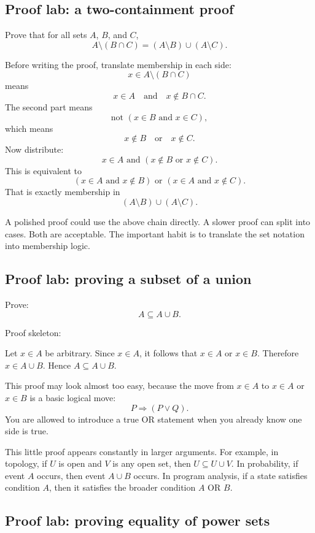 \subsection{Proof lab: a two-containment proof}

\begin{labbox}
Prove that for all sets $A$, $B$, and $C$,
\[
A\setminus(B\cap C)=(A\setminus B)\cup(A\setminus C).
\]

Before writing the proof, translate membership in each side:
\[
x\in A\setminus(B\cap C)
\]
means
\[
x\in A\quad\text{and}\quad x\notin B\cap C.
\]
The second part means
\[
\text{not }(x\in B\text{ and }x\in C),
\]
which means
\[
x\notin B\quad\text{or}\quad x\notin C.
\]
Now distribute:
\[
x\in A\text{ and }(x\notin B\text{ or }x\notin C).
\]
This is equivalent to
\[
(x\in A\text{ and }x\notin B)\text{ or }(x\in A\text{ and }x\notin C).
\]
That is exactly membership in
\[
(A\setminus B)\cup(A\setminus C).
\]
\end{labbox}

A polished proof could use the above chain directly. A slower proof can split into cases. Both are acceptable. The important habit is to translate the set notation into membership logic.

\subsection{Proof lab: proving a subset of a union}

\begin{labbox}
Prove:
\[
A\subseteq A\cup B.
\]

Proof skeleton:

Let $x\in A$ be arbitrary. Since $x\in A$, it follows that $x\in A$ or $x\in B$. Therefore $x\in A\cup B$. Hence $A\subseteq A\cup B$.
\end{labbox}

This proof may look almost too easy, because the move from $x\in A$ to $x\in A$ or $x\in B$ is a basic logical move:
\[
P\Rightarrow(P\lor Q).
\]
You are allowed to introduce a true OR statement when you already know one side is true.

This little proof appears constantly in larger arguments. For example, in topology, if $U$ is open and $V$ is any open set, then $U\subseteq U\cup V$. In probability, if event $A$ occurs, then event $A\cup B$ occurs. In program analysis, if a state satisfies condition $A$, then it satisfies the broader condition $A$ OR $B$.

\subsection{Proof lab: proving equality of power sets}

